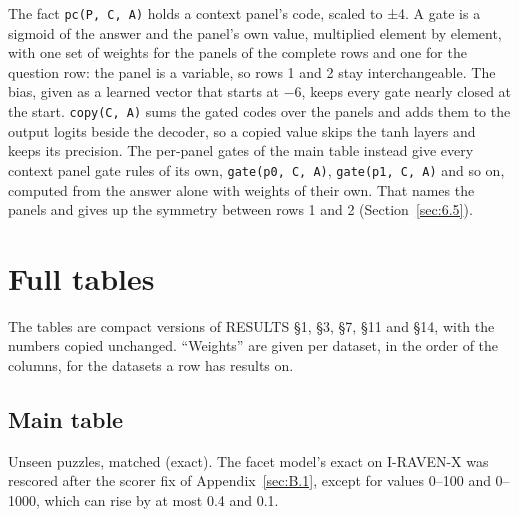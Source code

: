 The fact \texttt{pc(P, C, A)} holds a context panel's code, scaled to ±4. A gate is a sigmoid of the answer and the panel's own value, multiplied element by element, with one set of weights for the panels of the complete rows and one for the question row: the panel is a variable, so rows 1 and 2 stay interchangeable. The bias, given as a learned vector that starts at −6, keeps every gate nearly closed at the start. \texttt{copy(C, A)} sums the gated codes over the panels and adds them to the output logits beside the decoder, so a copied value skips the tanh layers and keeps its precision. The per-panel gates of the main table instead give every context panel gate rules of its own, \texttt{gate(p0, C, A)}, \texttt{gate(p1, C, A)} and so on, computed from the answer alone with weights of their own. That names the panels and gives up the symmetry between rows 1 and 2 (Section~\ref{sec:6.5}).

\chapter{Full tables}\label{app:D}

The tables are compact versions of RESULTS \S{}1, \S{}3, \S{}7, \S{}11 and \S{}14, with the numbers copied unchanged. ``Weights'' are given per dataset, in the order of the columns, for the datasets a row has results on.

\section{Main table}\label{sec:D.1}

Unseen puzzles, matched (exact). The facet model's exact on I-RAVEN-X was rescored after the scorer fix of Appendix~\ref{sec:B.1}, except for values 0–100 and 0–1000, which can rise by at most 0.4 and 0.1.


